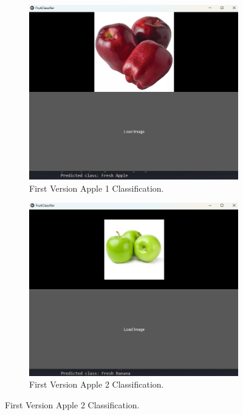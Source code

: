 \documentclass[conference]{IEEEtran}
\begin{document}
\begin{figure}[h]
    \centering
    \begin{subfigure}[b]{0.48\linewidth}
        \centering
        \includegraphics[width=\linewidth]{1layer appel1.png}
        \caption{First Version Apple 1 Classification.}
        \label{figFA}
    \end{subfigure}
    \hfill
    \begin{subfigure}[b]{0.48\linewidth}
        \centering
        \includegraphics[width=\linewidth]{1layer appel2.png}
        \caption{First Version Apple 2 Classification.}

\end{subfigure}
\end{figure}
\end{document}
